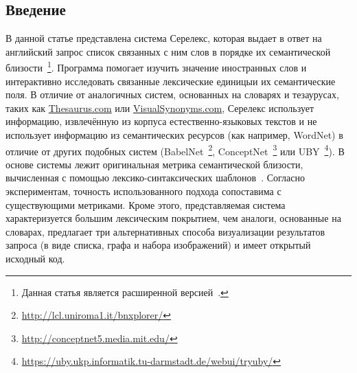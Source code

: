 \documentclass[a4paper,10pt,twoside]{article}
\begin{document}

\author{Панченко А.И.${}^{1,2}$, Романов П.В.${}^2$, Романов А.В${}^1$, \linebreak Филиппович А.Ю.${}^2$, Филиппович Ю.Н.${}^2$, Морозова О.И.${}^1$}




\subsection{Введение}

В данной статье представлена система Серелекс, которая выдает в ответ на английский запрос список связанных с ним слов в порядке их семантической близости~\footnote{Данная статья является расширенной версией~\cite{panchenko2013serelex}.}. Программа помогает изучить значение иностранных слов и интерактивно исследовать связанные лексические единицыи их семантические поля. В отличие от аналогичных систем, основанных на словарях и тезаурусах, таких как \url{Thesaurus.com} или \url{VisualSynonyms.com}, Серелекс использует информацию, извлечённую из корпуса естественно-языковых текстов и не использует информацию из семантических ресурсов (как например, WordNet) в отличие от других подобных систем (BabelNet~\footnote{ \url{http://lcl.uniroma1.it/bnxplorer/}}, ConceptNet~\footnote{ \url{http://conceptnet5.media.mit.edu/}} или UBY~\footnote{\url{https://uby.ukp.informatik.tu-darmstadt.de/webui/tryuby/}}). В основе системы лежит оригинальная метрика семантической близости, вычисленная с помощью лексико-синтаксических шаблонов~\cite{panchenko2012konvens}. Согласно экспериментам, точность использованного подхода сопоставима с существующими метриками. Кроме этого, представляемая система характеризуется большим лексическим покрытием, чем аналоги, основанные на словарах, предлагает три альтернативных способа визуализации результатов запроса (в виде списка, графа и набора изображений) и имеет открытый исходный код.
\end{document}
